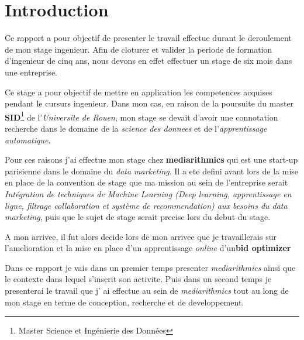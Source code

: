 \section*{Introduction}

Ce rapport a pour objectif de presenter le travail effectue durant le deroulement de mon stage ingenieur. 
Afin de cloturer et valider la periode de formation d'ingenieur de cinq ans, nous devons en effet effectuer un stage de
six mois dans une entreprise. \par
Ce stage a pour objectif de mettre en application les competences acquises pendant le cursurs
ingenieur. Dans mon cas, en raison de la poursuite du master \textbf{SID}\footnote{Master Science et Ingénierie des Données} de l'\emph{Universite de Rouen},
mon  stage se devait d'avoir une connotation recherche dans le domaine de la \emph{science des donnees} et de l'\emph{apprentissage automatique}. \par
Pour ces raisons j'ai effectue mon stage chez \textbf{mediarithmics} qui est une start-up parisienne
dans le domaine du \emph{data marketing}. Il a ete defini avant lors de la mise en place de la convention de stage
que ma mission au sein de l'entreprise serait \emph{Intégration de techniques de Machine Learning (Deep learning, apprentissage en ligne, filtrage collaboration et système de recommendation) aux besoins du data marketing}, puis que le sujet de stage serait precise lors
du debut du stage.  \par
A mon arrivee, il fut alors decide lors de mon arrivee que je travaillerais sur l'amelioration et la mise en place d'un apprentissage \emph{online} d'un\textbf{bid optimizer} \par

Dans ce rapport je vais dans un premier temps presenter \emph{mediarithmics} ainsi que le contexte dans lequel s'inscrit son activite. Puis dans un second temps je presenterai le travail que j'
ai effectue au sein de \emph{mediarithmics} tout au long de mon stage en terme de conception, recherche et de developpement.


